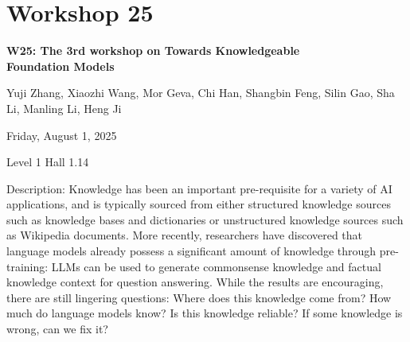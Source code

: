 \clearpage


\section[W25: The 3rd workshop on Towards Knowledgeable Foundation Models]{Workshop 25}
\label{workshop_25}

\begin{center}
    {\Large \textbf{W25: The 3rd workshop on Towards Knowledgeable \\
    Foundation Models}}\\

 \vspace{5mm}

Yuji Zhang, Xiaozhi Wang, Mor Geva, Chi Han, Shangbin Feng, Silin Gao, Sha Li, Manling Li, Heng Ji\\

 \vspace{5mm}

    Friday, August 1, 2025

 Level 1 Hall 1.14
    
\end{center}

Description: Knowledge has been an important pre-requisite for a variety of AI applications, and is typically sourced from either structured knowledge sources such as knowledge bases and dictionaries or unstructured knowledge sources such as Wikipedia documents. More recently, researchers have discovered that language models already possess a significant amount of knowledge through pre-training: LLMs can be used to generate commonsense knowledge and factual knowledge context for question answering. While the results are encouraging, there are still lingering questions: Where does this knowledge come from? How much do language models know? Is this knowledge reliable? If some knowledge is wrong, can we fix it?

